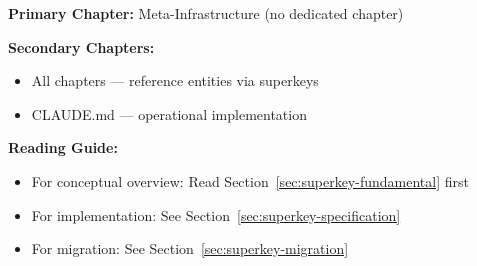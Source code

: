 
\begin{tcolorbox}[colback=purple!5!white, colframe=purple!75!black,
    title=Chapter Linkage]

\textbf{Primary Chapter:} Meta-Infrastructure (no dedicated chapter)

\textbf{Secondary Chapters:}
\begin{itemize}[nosep]
\item All chapters --- reference entities via superkeys
\item CLAUDE.md --- operational implementation
\end{itemize}

\textbf{Reading Guide:}
\begin{itemize}[nosep]
\item For conceptual overview: Read Section~\ref{sec:superkey-fundamental} first
\item For implementation: See Section~\ref{sec:superkey-specification}
\item For migration: See Section~\ref{sec:superkey-migration}
\end{itemize}

\end{tcolorbox}



\begin{abstract}
This appendix specifies the unified superkey system for all EBF databases.
A superkey is a unique identifier that enables cross-database referencing
and ensures referential integrity. The specification covers 13 entity types
across 5 hierarchical levels: Organisation, Knowledge, Output, Action, and Learning.
Key design decisions include: hierarchical keys for customer-bound entities,
flat keys for global knowledge entities, version management via attributes
rather than key modification, and PAP- prefix for papers to prevent LLM hallucination.
\end{abstract}



